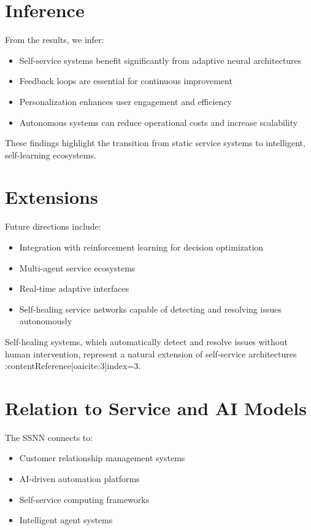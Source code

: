 \documentclass[12pt]{article}
\begin{document}
\section{Inference}

From the results, we infer:

\begin{itemize}
\item Self-service systems benefit significantly from adaptive neural architectures
\item Feedback loops are essential for continuous improvement
\item Personalization enhances user engagement and efficiency
\item Autonomous systems can reduce operational costs and increase scalability
\end{itemize}

These findings highlight the transition from static service systems to intelligent, self-learning ecosystems.

\section{Extensions}

Future directions include:

\begin{itemize}
\item Integration with reinforcement learning for decision optimization
\item Multi-agent service ecosystems
\item Real-time adaptive interfaces
\item Self-healing service networks capable of detecting and resolving issues autonomously
\end{itemize}

Self-healing systems, which automatically detect and resolve issues without human intervention, represent a natural extension of self-service architectures :contentReference[oaicite:3]{index=3}.

\section{Relation to Service and AI Models}

The SSNN connects to:

\begin{itemize}
\item Customer relationship management systems
\item AI-driven automation platforms
\item Self-service computing frameworks
\item Intelligent agent systems
\end{itemize}
\end{document}
